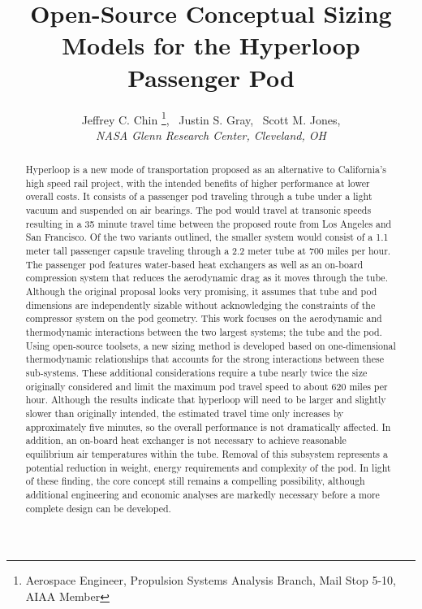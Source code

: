 \documentclass[]             %
{aiaa-tc}                       %
\title{Open-Source Conceptual Sizing Models for the Hyperloop Passenger Pod}
\author{
  Jeffrey C. Chin%
     \footnote{Aerospace Engineer, Propulsion Systems Analysis Branch, Mail Stop 5-10, AIAA Member},
  \ Justin S. Gray\footnotemark[\value{footnote}] ,%
  \ Scott M. Jones\footnotemark[\value{footnote}] ,%
   \\
  {\normalsize\itshape
  NASA Glenn Research Center, Cleveland, OH}
}
\begin{document}
\maketitle

\begin{abstract}
Hyperloop is a new mode of transportation proposed as an alternative to California's high speed rail project,
with the intended benefits of higher performance at lower overall costs.
It consists of a passenger pod traveling through a tube under a light vacuum and suspended on air bearings.
The pod would travel at transonic speeds resulting in a 35 minute travel time between the proposed route from Los Angeles and San Francisco.
Of the two variants outlined, the smaller system would consist of a 1.1 meter tall passenger capsule traveling through a 2.2 meter tube at 700 miles per hour.
The passenger pod features water-based heat exchangers as well as an on-board compression system that reduces the aerodynamic drag as it moves through the tube.
Although the original proposal looks very promising,
it assumes that tube and pod dimensions are independently sizable without acknowledging the constraints of the compressor system on the pod geometry.
This work focuses on the aerodynamic and thermodynamic interactions between the two largest systems; the tube and the pod.
Using open-source toolsets, a new sizing method is developed based on one-dimensional thermodynamic relationships that accounts for the strong interactions between these sub-systems.
These additional considerations require a tube nearly twice the size originally considered and limit the maximum pod travel speed to about 620 miles per hour.
Although the results indicate that hyperloop will need to be larger and slightly slower than originally intended,
the estimated travel time only increases by approximately five minutes, so the overall performance is not dramatically affected.
In addition, an on-board heat exchanger is not necessary to achieve reasonable equilibrium air temperatures within the tube.
Removal of this subsystem represents a potential reduction in weight, energy requirements and complexity of the pod.
In light of these finding, the core concept still remains a compelling possibility,
although additional engineering and economic analyses are markedly necessary before a more complete design can be developed.


\end{abstract}  

\setcounter{secnumdepth}{1}
\setcounter{tocdepth}{1}
\printnomenclature
 





\end{document}
